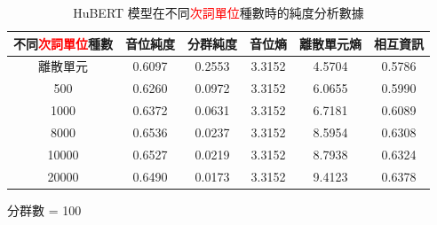 {{\begin{table}[!htbp]
            \begin{subtable}[t]{\textwidth}
                \centering
                \begin{tabular}{|c|c|c|c|c|c|} \hline
                    不同\textcolor{red}{次詞單位}種數 & 音位純度   & 分群純度   & 音位熵    & 離散單元熵  & 相互資訊   \\ \hline
                                             離散單元 &     0.6097 &     0.2553 &    3.3152 &      4.5704 &     0.5786 \\ \hline
                                                 500  &     0.6260 &     0.0972 &    3.3152 &      6.0655 &     0.5990 \\ \hline %
                                                1000  &     0.6372 &     0.0631 &    3.3152 &      6.7181 &     0.6089 \\ \hline %
                                                8000  &     0.6536 &     0.0237 &    3.3152 &      8.5954 &     0.6308 \\ \hline %
                                               10000  &     0.6527 &     0.0219 &    3.3152 &      8.7938 &     0.6324 \\ \hline %
                                               20000  &     0.6490 &     0.0173 &    3.3152 &      9.4123 &     0.6378 \\ \hline %
                \end{tabular}
                \caption{分群數 = 100}
                \label{tab:ch4-hubert-phn-clu100-}
            \end{subtable}

            \caption{HuBERT 模型在不同\textcolor{red}{次詞單位}種數時的純度分析數據}
            \label{tab:hubert-phn-results-}
        \end{table}

}}

